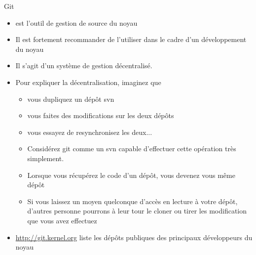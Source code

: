\begin{frame}[fragile=singleslide]{Git}
  \begin{itemize} 
  \item {} est l'outil de gestion de source du noyau
  \item  Il est fortement  recommander de  l'utiliser dans  le cadre
    d'un développement du noyau
  \item Il s'agit d'un système de gestion décentralisé. 
  \item Pour expliquer la décentralisation, imaginez que
    \begin{itemize} 
    \item vous dupliquez un dépôt svn
    \item vous faites des modifications sur les deux dépôts
    \item vous essayez de resynchronisez les deux...
    \item  Considérez  git  comme  un svn  capable  d'effectuer  cette
      opération très simplement.
    \item Lorsque vous récupérez le code d'un dépôt, vous devenez vous
      même dépôt
    \item Si  vous laissez  un moyen quelconque  d'accès en  lecture à
      votre dépôt, d'autres personne pourrons à leur tour le cloner ou
      tirer les modification que vous avez effectuez
    \end{itemize} 
  \item  \url{http://git.kernel.org} liste  les  dépôts publiques  des
    principaux développeurs du noyau
  \end{itemize}
\end{frame}

